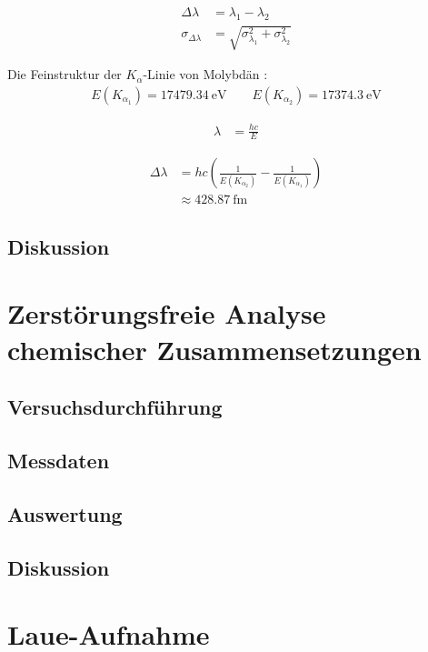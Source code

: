 \documentclass[10pt, a4paper]{article}
\begin{document}
\begin{align}
  \Delta \lambda &= \lambda_1 - \lambda_2 \\
  \sigma_{\Delta \lambda} &= \sqrt{\sigma_{\lambda_1}^2 + \sigma_{\lambda_2}^2}
\end{align}




Die Feinstruktur der $K_\alpha$-Linie von Molybdän \cite{booklet}:
\begin{align*}
  E(K_{\alpha_1}) = \SI{17479,34}{\electronvolt} \qquad E(K_{\alpha_2}) = \SI{17374,3}{\electronvolt}
\end{align*}

\begin{align}
  \lambda &= \frac{h c}{E}
\end{align}

\begin{align*}
  \Delta \lambda &= h c \left( \frac{1}{E(K_{\alpha_2})} - \frac{1}{E(K_{\alpha_1})} \right) \\
  &\approx \SI{428,87}{\femto\metre}
\end{align*}

\begin{table}
\centering

\end{table}
\subsection{Diskussion}

\section{Zerstörungsfreie Analyse chemischer Zusammensetzungen}
\subsection{Versuchsdurchführung}
\subsection{Messdaten}
\subsection{Auswertung}
\subsection{Diskussion}

\section{Laue-Aufnahme}
\end{document}
